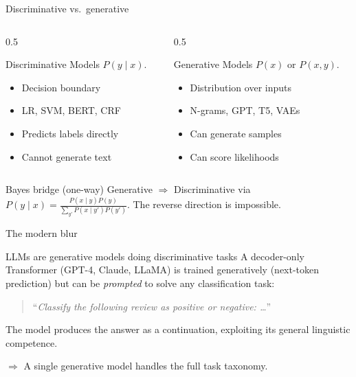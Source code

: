 \documentclass[11pt,aspectratio=169]{beamer}
\begin{document}
\begin{frame}{Discriminative vs.\ generative}
\begin{columns}[T]
\begin{column}{0.5\textwidth}
\begin{block}{Discriminative}
Models $P(y \mid x)$.
\begin{itemize}
    \item Decision boundary
    \item LR, SVM, BERT, CRF
    \item Predicts labels directly
    \item Cannot generate text
\end{itemize}
\end{block}
\end{column}
\begin{column}{0.5\textwidth}
\begin{block}{Generative}
Models $P(x)$ or $P(x, y)$.
\begin{itemize}
    \item Distribution over inputs
    \item N-grams, GPT, T5, VAEs
    \item Can generate samples
    \item Can score likelihoods
\end{itemize}
\end{block}
\end{column}
\end{columns}
\vfill
\begin{exampleblock}{Bayes bridge (one-way)}
Generative $\Rightarrow$ Discriminative via $P(y \mid x) = \frac{P(x \mid y) P(y)}{\sum_{y'} P(x \mid y') P(y')}$.
The reverse direction is impossible.
\end{exampleblock}
\end{frame}

\begin{frame}{The modern blur}
\begin{alertblock}{LLMs are generative models doing discriminative tasks}
A decoder-only Transformer (GPT-4, Claude, LLaMA) is trained generatively (next-token prediction) but can be \emph{prompted} to solve any classification task:
\begin{quote}
``\emph{Classify the following review as positive or negative: \dots}''
\end{quote}
The model produces the answer as a continuation, exploiting its general linguistic competence.
\end{alertblock}
\vfill
$\Rightarrow$ A single generative model handles the full task taxonomy.
\end{frame}
\end{document}
